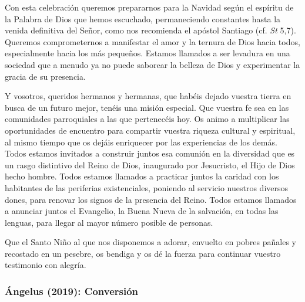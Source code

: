 \begin{body}
					Con esta celebración queremos prepararnos para la Navidad según el espíritu de la Palabra de Dios que hemos escuchado, permaneciendo constantes hasta la venida definitiva del Señor, como nos recomienda el apóstol Santiago (cf. \emph{St} 5,7). Queremos comprometernos a manifestar el amor y la ternura de Dios hacia todos, especialmente hacia los más pequeños. Estamos llamados a ser levadura en una sociedad que a menudo ya no puede saborear la belleza de Dios y experimentar la gracia de su presencia.
					
					Y vosotros, queridos hermanos y hermanas, que habéis dejado vuestra tierra en busca de un futuro mejor, tenéis una misión especial. Que vuestra fe sea  en las comunidades parroquiales a las que pertenecéis hoy. Os animo a multiplicar las oportunidades de encuentro para compartir vuestra riqueza cultural y espiritual, al mismo tiempo que os dejáis enriquecer por las experiencias de los demás. Todos estamos invitados a construir juntos esa comunión en la diversidad que es un rasgo distintivo del Reino de Dios, inaugurado por Jesucristo, el Hijo de Dios hecho hombre. Todos estamos llamados a practicar juntos la caridad con los habitantes de las periferias existenciales, poniendo al servicio nuestros diversos dones, para renovar los signos de la presencia del Reino. Todos estamos llamados a anunciar juntos el Evangelio, la Buena Nueva de la salvación, en todas las lenguas, para llegar al mayor número posible de personas.
					
					Que el Santo Niño al que nos disponemos a adorar, envuelto en pobres pañales y recostado en un pesebre, os bendiga y os dé la fuerza para continuar vuestro testimonio con alegría.
				\end{body}

			\subsubsection{Ángelus (2019): Conversión}
			
				
